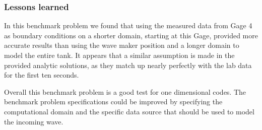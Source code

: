 \subsubsection{Lessons learned}
In this benchmark problem we found that using the measured data from Gage 4 as boundary conditions on a shorter domain, starting at this Gage, provided more accurate results than using the wave maker position and a longer domain to model the entire tank.  It appears that a similar assumption is made in the provided analytic solutions, as they match up nearly perfectly with the lab data for the first ten seconds.  

Overall this benchmark problem is a good test for one dimensional codes.  The benchmark problem specifications could be improved by specifying the computational domain and the specific data source that should be used to model the incoming wave. 
